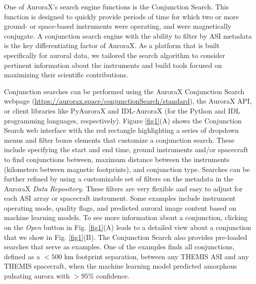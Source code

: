 \documentclass[utf8]{FrontiersinHarvard} %
\begin{document}
One of AuroraX's search engine functions is the Conjunction Search. This function is designed to quickly provide periods of time for which two or more ground- or space-based instruments were operating, and were magnetically conjugate. A conjunction search engine with the ability to filter by ASI metadata is the key differentiating factor of AuroraX. As a platform that is built specifically for auroral data, we tailored the search algorithm to consider pertinent information about the instruments and build tools focused on maximizing their scientific contributions.

Conjunction searches can be performed using the AuroraX Conjunction Search webpage (\url{https://aurorax.space/conjunctionSearch/standard}), the AuroraX API, or client libraries like PyAuroraX and IDL-AuroraX (for the Python and IDL programming languages, respectively). Figure \ref{fig1}(A) shows the Conjunction Search web interface with the red rectangle highlighting a series of dropdown menus and filter boxes elements that customize a conjunction search. These include specifying the start and end time, ground instruments and/or spacecraft to find conjunctions between, maximum distance between the instruments (kilometers between magnetic footprints), and conjunction type. Searches can be further refined by using a customizable set of filters on the metadata in the AuroraX \textit{Data Repository}. These filters are very flexible and easy to adjust for each ASI array or spacecraft instrument. Some examples include instrument operating mode, quality flags, and predicted auroral image content based on machine learning models. To see more information about a conjunction, clicking on the \textit{Open} button in Fig. \ref{fig1}(A) leads to a detailed view about a conjunction that we show in Fig. \ref{fig1}(B). The Conjunction Search also provides pre-loaded searches that serve as examples. One of the examples finds all conjunctions, defined as a $<500$ km footprint separation, between any THEMIS ASI and any THEMIS spacecraft, when the machine learning model predicted amorphous pulsating aurora with $>95\%$ confidence.
\end{document}

